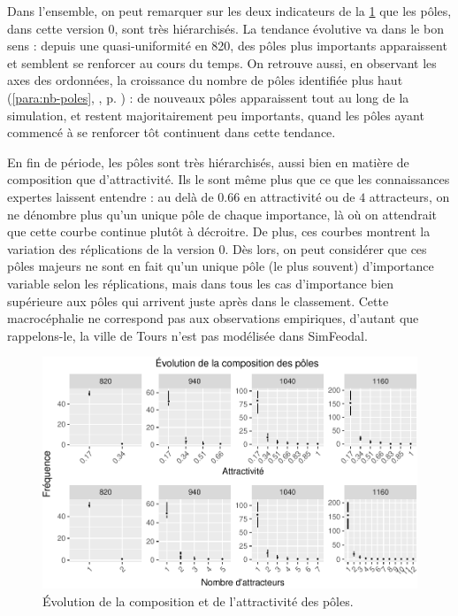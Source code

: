 \begin{mdframed}[backgroundcolor=gray!10,footnoteinside=false]
Dans l'ensemble, on peut remarquer sur les deux indicateurs de la \cref{fig:compo-poles-v0} que les pôles, dans cette version 0, sont très hiérarchisés.
La tendance \og évolutive va dans le bon sens :
depuis une quasi-uniformité en 820, des pôles plus importants apparaissent et semblent se renforcer au cours du temps.
On retrouve aussi, en observant les axes des ordonnées, la croissance du nombre de pôles identifiée plus haut (\ref{para:nb-poles}, , p. \pageref{para:nb-poles}) :
de nouveaux pôles apparaissent tout au long de la simulation, et restent majoritairement peu importants, quand les pôles ayant commencé à se renforcer tôt continuent dans cette tendance.

En fin de période, les pôles sont très hiérarchisés, aussi bien en matière de composition que d'attractivité.
Ils le sont même plus que ce que les connaissances expertes laissent entendre :
au delà de $0.66$ en attractivité ou de $4$ attracteurs, on ne dénombre plus qu'un unique pôle de chaque importance, là où on attendrait que cette courbe continue plutôt à décroitre.
De plus, ces courbes montrent la variation des réplications de la version 0.
Dès lors, on peut considérer que ces pôles majeurs ne sont en fait qu'un unique pôle (le plus souvent) d'importance variable selon les réplications, mais dans tous les cas d'importance bien supérieure aux pôles qui arrivent juste après dans le classement.
Cette macrocéphalie ne correspond pas aux observations empiriques, d'autant que rappelons-le, la ville de Tours n'est pas modélisée dans SimFeodal.	


\end{mdframed}

\begin{figure}[H]
\captionsetup{width=\linewidth}
\includegraphics[width=\linewidth]{img/resultats/v0_compo_poles.pdf}
\caption{Évolution de la composition et de l'attractivité des pôles\protect\footnotemark{}.} 
\label{fig:compo-poles-v0}
\end{figure}

